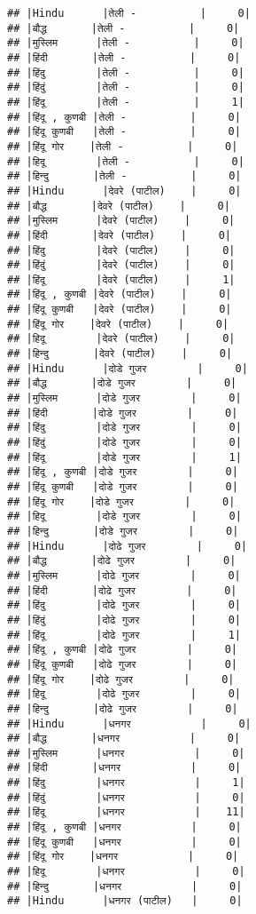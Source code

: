 \documentclass[
]{article}
\begin{document}
\begin{verbatim}
## |Hindu      |तेली -          |     0|
## |बौद्ध       |तेली -          |     0|
## |मुस्लिम      |तेली -          |     0|
## |हिंदी       |तेली -          |     0|
## |हिंदु        |तेली -          |     0|
## |हिंदुं        |तेली -          |     0|
## |हिंदू        |तेली -          |     1|
## |हिंदू , कुणबी |तेली -          |     0|
## |हिंदू कुणबी   |तेली -          |     0|
## |हिंदू गोर    |तेली -          |     0|
## |हिदू        |तेली -          |     0|
## |हिन्दु       |तेली -          |     0|
## |Hindu      |देवरे (पाटील)    |     0|
## |बौद्ध       |देवरे (पाटील)    |     0|
## |मुस्लिम      |देवरे (पाटील)    |     0|
## |हिंदी       |देवरे (पाटील)    |     0|
## |हिंदु        |देवरे (पाटील)    |     0|
## |हिंदुं        |देवरे (पाटील)    |     0|
## |हिंदू        |देवरे (पाटील)    |     1|
## |हिंदू , कुणबी |देवरे (पाटील)    |     0|
## |हिंदू कुणबी   |देवरे (पाटील)    |     0|
## |हिंदू गोर    |देवरे (पाटील)    |     0|
## |हिदू        |देवरे (पाटील)    |     0|
## |हिन्दु       |देवरे (पाटील)    |     0|
## |Hindu      |दोडे गुजर        |     0|
## |बौद्ध       |दोडे गुजर        |     0|
## |मुस्लिम      |दोडे गुजर        |     0|
## |हिंदी       |दोडे गुजर        |     0|
## |हिंदु        |दोडे गुजर        |     0|
## |हिंदुं        |दोडे गुजर        |     0|
## |हिंदू        |दोडे गुजर        |     1|
## |हिंदू , कुणबी |दोडे गुजर        |     0|
## |हिंदू कुणबी   |दोडे गुजर        |     0|
## |हिंदू गोर    |दोडे गुजर        |     0|
## |हिदू        |दोडे गुजर        |     0|
## |हिन्दु       |दोडे गुजर        |     0|
## |Hindu      |दोढे गुजर        |     0|
## |बौद्ध       |दोढे गुजर        |     0|
## |मुस्लिम      |दोढे गुजर        |     0|
## |हिंदी       |दोढे गुजर        |     0|
## |हिंदु        |दोढे गुजर        |     0|
## |हिंदुं        |दोढे गुजर        |     0|
## |हिंदू        |दोढे गुजर        |     1|
## |हिंदू , कुणबी |दोढे गुजर        |     0|
## |हिंदू कुणबी   |दोढे गुजर        |     0|
## |हिंदू गोर    |दोढे गुजर        |     0|
## |हिदू        |दोढे गुजर        |     0|
## |हिन्दु       |दोढे गुजर        |     0|
## |Hindu      |धनगर           |     0|
## |बौद्ध       |धनगर           |     0|
## |मुस्लिम      |धनगर           |     0|
## |हिंदी       |धनगर           |     0|
## |हिंदु        |धनगर           |     1|
## |हिंदुं        |धनगर           |     0|
## |हिंदू        |धनगर           |    11|
## |हिंदू , कुणबी |धनगर           |     0|
## |हिंदू कुणबी   |धनगर           |     0|
## |हिंदू गोर    |धनगर           |     0|
## |हिदू        |धनगर           |     0|
## |हिन्दु       |धनगर           |     0|
## |Hindu      |धनगर (पाटील)   |     0|

\end{verbatim}
\end{document}
